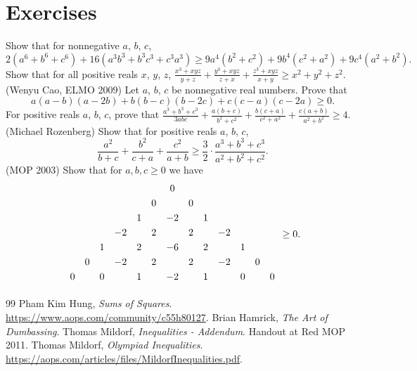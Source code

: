 \documentclass{scrartcl}
\begin{document}
\section{Exercises}
\begin{enumerate}
  \ii Show that for nonnegative $a$, $b$, $c$,
    \[ 2(a^6+b^6+c^6) + 16(a^3b^3+b^3c^3+c^3a^3) \ge 9a^4(b^2+c^2) + 9b^4(c^2+a^2) + 9c^4(a^2+b^2). \]
  \ii Show that for all positive reals $x$, $y$, $z$,
    $\frac{x^3+xyz}{y+z} + \frac{y^3+xyz}{z+x} + \frac{z^3+xyz}{x+y} \ge x^2+y^2+z^2$.
  \ii (Wenyu Cao, ELMO 2009) Let $a$, $b$, $c$ be nonnegative real numbers.
    Prove that \[ a(a-b)(a-2b)+b(b-c)(b-2c)+c(c-a)(c-2a)\geq 0. \]
  \ii For positive reals $a$, $b$, $c$, prove that
    $\frac{a^{3}+b^{3}+c^{3}}{3abc}+\frac{a(b+c)}{b^{2}+c^{2}}
    +\frac{b(c+a)}{c^{2}+a^{2}}+\frac{c(a+b)}{a^{2}+b^{2}}\geq 4$.
  \ii (Michael Rozenberg) Show that for positive reals $a$, $b$, $c$,
    \[ \frac{a^2}{b+c} + \frac{b^2}{c+a} + \frac{c^2}{a+b} \ge \frac{3}{2} \cdot \frac{a^3+b^3+c^3}{a^2+b^2+c^2}. \]
  \ii (MOP 2003) Show that for $a,b,c \ge 0$ we have
  \[ \begin{array}{rccccccccccccc}& & & & & & 0\\\noalign{\smallskip}
    & & & & & 0 & & 0\\\noalign{\smallskip}
    & & & & 1 & &-2 & & 1\\\noalign{\smallskip}
    & & &-2 & & 2 & & 2 & &-2\\\noalign{\smallskip}
    & & 1 & & 2 & &-6 & & 2 & & 1\\\noalign{\smallskip}
    & 0 & &-2 & & 2 & & 2 & &-2 & & 0\\\noalign{\smallskip}
    0 & & 0 & & 1 & &-2 & & 1 & & 0 & & 0\\\noalign{\smallskip}
    \end{array} \ge 0. \]
\end{enumerate}

\begin{thebibliography}{99}
   Pham Kim Hung, \textit{Sums of Squares}.
    \url{https://www.aops.com/community/c55h80127}.
   Brian Hamrick, \textit{The Art of Dumbassing}.
   Thomas Mildorf, \textit{Inequalities - Addendum}.
    Handout at Red MOP 2011.
   Thomas Mildorf, \textit{Olympiad Inequalities}.
    \url{https://aops.com/articles/files/MildorfInequalities.pdf}.
\end{thebibliography}
\end{document}

